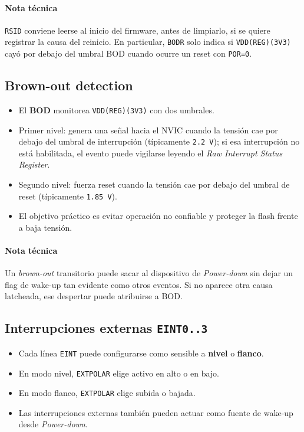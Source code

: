 \paragraph{Nota t\'ecnica}
\texttt{RSID} conviene leerse al inicio del firmware, antes de limpiarlo, si se quiere registrar la causa del reinicio. En particular, \texttt{BODR} solo indica si \texttt{VDD(REG)(3V3)} cay\'o por debajo del umbral BOD cuando ocurre un reset con \texttt{POR=0}.

\subsection{Brown-out detection}
\begin{itemize}
  \item El \textbf{BOD} monitorea \texttt{VDD(REG)(3V3)} con dos umbrales.
  \item Primer nivel: genera una se\~nal hacia el NVIC cuando la tensi\'on cae por debajo del umbral de interrupci\'on (t\'ipicamente \texttt{2.2 V}); si esa interrupci\'on no est\'a habilitada, el evento puede vigilarse leyendo el \textit{Raw Interrupt Status Register}.
  \item Segundo nivel: fuerza reset cuando la tensi\'on cae por debajo del umbral de reset (t\'ipicamente \texttt{1.85 V}).
  \item El objetivo pr\'actico es evitar operaci\'on no confiable y proteger la flash frente a baja tensi\'on.
\end{itemize}

\paragraph{Nota t\'ecnica}
Un \textit{brown-out} transitorio puede sacar al dispositivo de \textit{Power-down} sin dejar un flag de wake-up tan evidente como otros eventos. Si no aparece otra causa latcheada, ese despertar puede atribuirse a BOD.

\subsection{Interrupciones externas \texttt{EINT0..3}}
\begin{itemize}
  \item Cada l\'inea \texttt{EINT} puede configurarse como sensible a \textbf{nivel} o \textbf{flanco}.
  \item En modo nivel, \texttt{EXTPOLAR} elige activo en alto o en bajo.
  \item En modo flanco, \texttt{EXTPOLAR} elige subida o bajada.
  \item Las interrupciones externas tambi\'en pueden actuar como fuente de wake-up desde \textit{Power-down}.
\end{itemize}

